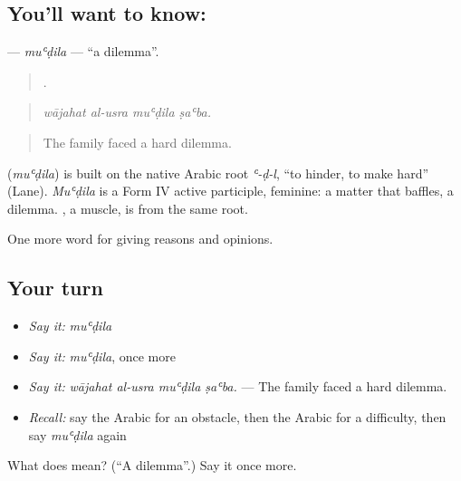 \subsection*{You'll want to know: }
\textbf{} — \emph{muʿḍila} — \textquotedblleft{}a dilemma\textquotedblright{}.

\begin{quote}
   .
\end{quote}

\begin{quote}
\emph{wājahat al-usra muʿḍila ṣaʿba.}
\end{quote}

\begin{quote}
The family faced a hard dilemma.
\end{quote}

\begin{cousinweb}
\textbf{} (\emph{muʿḍila}) is built on the native Arabic root \emph{ʿ-ḍ-l}, \textquotedblleft{}to hinder, to make hard\textquotedblright{} (Lane). \emph{Muʿḍila} is a Form IV active participle, feminine: a matter that baffles, a dilemma. , a muscle, is from the same root.
\end{cousinweb}

\begin{grammarlens}[title={What you've built}]
One more word for giving reasons and opinions.
\end{grammarlens}

\subsection*{Your turn}
\begin{itemize}
\raggedright
  \item \emph{Say it:} \emph{muʿḍila}
  \item \emph{Say it:} \emph{muʿḍila}, once more
  \item \emph{Say it:} \emph{wājahat al-usra muʿḍila ṣaʿba.} — The family faced a hard dilemma.
  \item \emph{Recall:} say the Arabic for an obstacle, then the Arabic for a difficulty, then say \emph{muʿḍila} again
\end{itemize}

\begin{tcolorbox}[breakable,colback=teal!4,colframe=teal!35!black,title={Before you move on}]
What does  mean? (\textquotedblleft{}A dilemma\textquotedblright{}.) Say it once more.
\end{tcolorbox}

